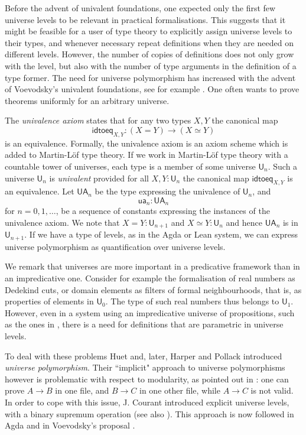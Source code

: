 \documentclass[11pt,a4paper]{article}
\theoremstyle{definition}
\newcommand{\UU}{\mathsf{U}}
\newcommand{\Level}{\mathsf{Level}}
\newcommand{\idtoeq}{\mathsf{idtoeq}}
\newcommand{\ua}{\mathsf{ua}}
\newcommand{\UA}{\mathsf{UA}}
\begin{document}
Before the advent of univalent foundations, one expected only the first few universe
levels to be relevant in practical formalisations. This suggests that it might be feasible
for a user of type theory to explicitly assign universe levels to their types, and whenever necessary
repeat definitions when they are needed on different levels. However, the number of copies of definitions
does not only grow with the level, but also with the number of type arguments in the definition of a type former.
The need for universe polymorphism has increased with the advent of Voevodsky's univalent foundations,
see for example \cite{VV}. One often wants to prove theorems uniformly for an arbitrary universe.

The {\em univalence axiom} states that for any two types $X,Y$ the canonical map
$$
\idtoeq_{X,Y} : (X=Y)\to (X\simeq Y)
$$
is an equivalence.
Formally, the univalence axiom is an axiom scheme which is added to Martin-Löf type theory. If we work in Martin-Löf type theory with a countable tower of universes, each type is a member of some universe $\UU_n$. Such a universe $\UU_n$ is {\em univalent} provided for all $X,Y : \UU_n$ the canonical map $\idtoeq_{X,Y}$ is an equivalence. Let $\UA_n$ be the type expressing the univalence of $\UU_n$, and
$$
\ua_n : \UA_n
$$
for $n = 0,1,\ldots$, be a sequence of constants expressing the instances of the univalence axiom. We note that $X = Y : \UU_{n+1}$ and $X\simeq Y : \UU_n$ and hence $\UA_n$ is in $\UU_{n+1}$.
If we have a type of levels, as in the Agda or Lean system,
we can express universe polymorphism as quantification over universe levels.

We remark that universes are more important in a predicative framework than in an impredicative one.
Consider for example the formalisation of real numbers as Dedekind cuts, or domain elements as filters of formal neighbourhoods, that is, as properties of elements in $\UU_0$. The type of such real numbers thus belongs to $\UU_1$. 
However, even in a system using an impredicative universe of propositions,
such as the ones in \cite{Huet87,moura:lean}, there is a need for definitions that are parametric
in universe levels.


 To deal with these problems Huet \cite{Huet87} and, later,
 Harper and Pollack \cite{HarperP91} introduced {\em universe polymorphism}.
 Their ``implicit"
 approach to universe polymorphisms however is problematic with respect to modularity, as pointed
 out in \cite{Courant02,Simpson04}: one can prove $A\rightarrow B$ in one file, and $B\rightarrow C$ in one other file, while
$A\rightarrow C$ is not valid. In order to cope with this issue, J. Courant \cite{Courant02}
introduced explicit universe levels, with a binary supremum operation (see also \cite{herbelin05}).
This approach is now followed in Agda and in Voevodsky's proposal \cite{VV}.
\end{document}
